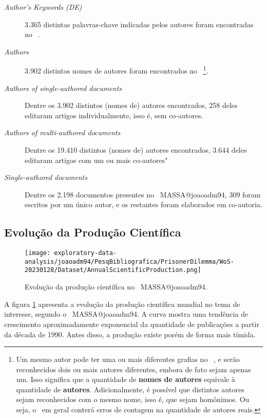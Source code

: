 \begin{description}
    \item [\textit{Author's Keywords (DE)}] 3.365 distintas palavras-chave indicadas pelos autores foram encontradas no \dataset\  .
    \item [\textit{Authors}] 3.902 distintos nomes de autores foram encontrados no \dataset\  \footnote{Um mesmo autor pode ter uma ou mais diferentes grafias no \dataset\  , e serão reconhecidos dois ou mais autores diferentes, embora de fato sejam apenas um. Isso significa que a quantidade de \textbf{nomes de autores} equivale à quantidade de \textbf{autores}. Adicionalmente, é possível que distintos autores sejam reconhecidos com o mesmo nome, isso é, que sejam homônimos. Ou seja, o \dataset\   em geral conterá erros de contagem na quantidade de autores reais.}.
    \item [\textit{Authors of single-authored documents}] Dentre os 3.902 distintos (nomes de) autores encontrados, 258 deles editaram artigos individualmente, isso é, sem co-autores.
    \item [\textit{Authors of multi-authored documents}] Dentre os 19.410 distintos (nomes de) autores encontrados, 3.644 deles editaram artigos com um ou mais co-autores"
    \item [\textit{Single-authored documents}] Dentre os 2.198 documentos presentes no \dataset\   MASSA@joaoadm94, 309 foram escritos por um único autor, e os restantes foram elaborados em co-autoria.
\end{description}

\subsection{Evolução da Produção Científica}

\begin{figure}
    \centering
    \texttt{[image: exploratory-data-analysis/joaoadm94/PesqBibliografica/PrisonerDilemma/WoS-20230128/Dataset/AnnualScientificProduction.png]}
    \caption{Evolução da produção científica no \dataset\ MASSA@joaoadm94.}
    \label{fig:evol:anual:MASSA@joaoadm94}
\end{figure}

A figura \ref{fig:evol:anual:MASSA@joaoadm94} apresenta a evolução da produção científica mundial no tema de interesse, segundo o \dataset\   MASSA@joaoadm94. A curva mostra uma tendência de crescimento aproximadamente exponencial da quantidade de publicações a partir da década de 1990. Antes disso, a produção existe porém de forma mais tímida.

